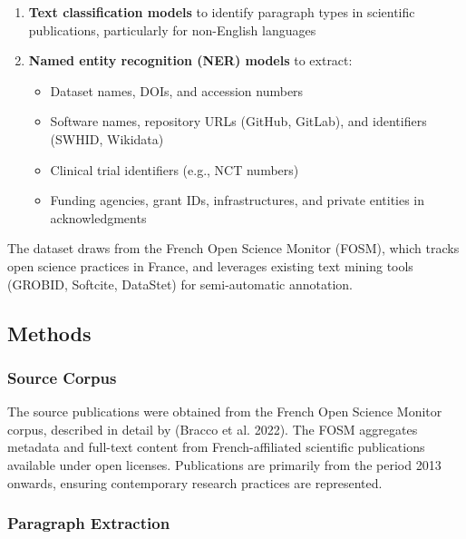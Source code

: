 \documentclass[
]{article}
\providecommand{\tightlist}{%
  \setlength{\itemsep}{0pt}\setlength{\parskip}{0pt}}
\begin{document}
\begin{enumerate}
\def\labelenumi{\arabic{enumi}.}
\tightlist
\item
  \textbf{Text classification models} to identify paragraph types in
  scientific publications, particularly for non-English languages
\item
  \textbf{Named entity recognition (NER) models} to extract:

  \begin{itemize}
  \tightlist
  \item
    Dataset names, DOIs, and accession numbers
  \item
    Software names, repository URLs (GitHub, GitLab), and identifiers
    (SWHID, Wikidata)
  \item
    Clinical trial identifiers (e.g., NCT numbers)
  \item
    Funding agencies, grant IDs, infrastructures, and private entities
    in acknowledgments
  \end{itemize}
\end{enumerate}

The dataset draws from the French Open Science Monitor (FOSM), which
tracks open science practices in France, and leverages existing text
mining tools (GROBID, Softcite, DataStet) for semi-automatic annotation.

\hypertarget{methods}{%
\subsection{Methods}\label{methods}}

\hypertarget{source-corpus}{%
\subsubsection{Source Corpus}\label{source-corpus}}

The source publications were obtained from the French Open Science
Monitor corpus, described in detail by (Bracco et al. 2022). The FOSM
aggregates metadata and full-text content from French-affiliated
scientific publications available under open licenses. Publications are
primarily from the period 2013 onwards, ensuring contemporary research
practices are represented.

\hypertarget{paragraph-extraction}{%
\subsubsection{Paragraph Extraction}\label{paragraph-extraction}}
\end{document}
